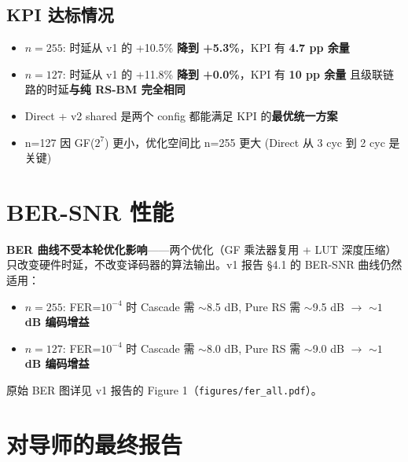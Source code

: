 \documentclass[11pt,a4paper]{article}
\begin{document}
\subsection{KPI 达标情况}

\begin{resultbox}[title=\textbf{KPI 达标情况}]
\begin{itemize}[leftmargin=1.5em, itemsep=1pt]
\item \textbf{$n=255$}: 时延从 v1 的 +10.5\% \textbf{降到 +5.3\%}，KPI 有 \textbf{4.7 pp 余量}
\item \textbf{$n=127$}: 时延从 v1 的 +11.8\% \textbf{降到 +0.0\%}，KPI 有 \textbf{10 pp 余量}
      且级联链路的时延\textbf{与纯 RS-BM 完全相同}
\item Direct + v2 shared 是两个 config 都能满足 KPI 的\textbf{最优统一方案}
\item n=127 因 GF($2^7$) 更小，优化空间比 n=255 更大 (Direct 从 3 cyc 到 2 cyc 是关键)
\end{itemize}
\end{resultbox}

\section{BER-SNR 性能}

\textbf{BER 曲线不受本轮优化影响}——两个优化（GF 乘法器复用 + LUT 深度压缩）
只改变硬件时延，不改变译码器的算法输出。v1 报告 §4.1 的 BER-SNR 曲线仍然适用：

\begin{itemize}[leftmargin=1.5em, itemsep=1pt]
\item \textbf{$n=255$}: FER=$10^{-4}$ 时 Cascade 需 $\sim$8.5 dB, Pure RS 需 $\sim$9.5 dB $\to$ \textbf{$\sim 1$ dB 编码增益}
\item \textbf{$n=127$}: FER=$10^{-4}$ 时 Cascade 需 $\sim$8.0 dB, Pure RS 需 $\sim$9.0 dB $\to$ \textbf{$\sim 1$ dB 编码增益}
\end{itemize}

原始 BER 图详见 v1 报告的 Figure 1（\texttt{figures/fer\_all.pdf}）。

\section{对导师的最终报告}
\end{document}
